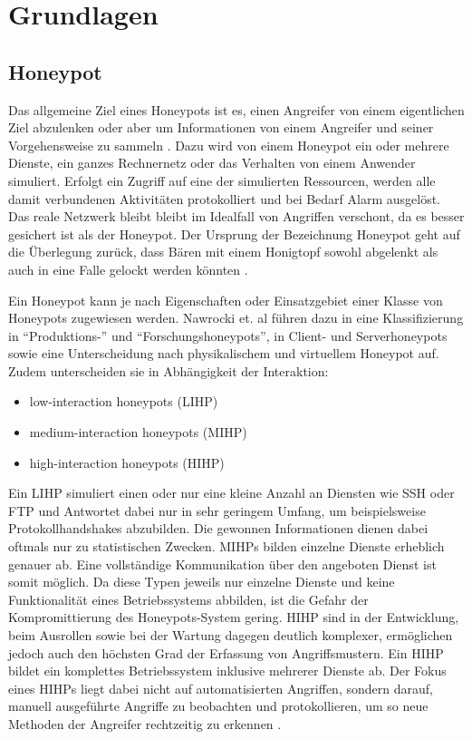 \chapter{Grundlagen}
\label{ch:Grundlagen}


\section{Honeypot}
\label{sec:Honeypot}

Das allgemeine Ziel eines Honeypots ist es, einen Angreifer von einem eigentlichen Ziel abzulenken oder aber um Informationen von einem Angreifer und seiner Vorgehensweise zu sammeln \cite{NawrockiWSKS16}. Dazu wird von einem Honeypot ein oder mehrere Dienste, ein ganzes Rechnernetz oder das Verhalten von einem Anwender simuliert. Erfolgt ein Zugriff auf eine der simulierten Ressourcen, werden alle damit verbundenen Aktivitäten protokolliert und bei Bedarf Alarm ausgelöst. Das reale Netzwerk bleibt bleibt im Idealfall von Angriffen verschont, da es besser gesichert ist als der Honeypot. Der Ursprung der Bezeichnung Honeypot geht auf die Überlegung zurück, dass Bären mit einem Honigtopf sowohl abgelenkt als auch in eine Falle gelockt werden könnten \cite{WikiHoney16}.


Ein Honeypot kann je nach Eigenschaften oder Einsatzgebiet einer Klasse von Honeypots zugewiesen werden. Nawrocki et. al führen dazu in \cite{NawrockiWSKS16} eine Klassifizierung in "`Produktions-"' und "`Forschungshoneypots"', in Client- und Serverhoneypots sowie eine Unterscheidung nach physikalischem und virtuellem Honeypot auf. Zudem unterscheiden sie in Abhängigkeit der Interaktion:

\begin{itemize}
\item low-interaction honeypots (LIHP)
\item medium-interaction honeypots (MIHP)
\item high-interaction honeypots (HIHP)
\end{itemize}

Ein LIHP simuliert einen oder nur eine kleine Anzahl an Diensten wie SSH oder FTP und Antwortet dabei nur in sehr geringem Umfang, um beispielsweise Protokollhandshakes abzubilden. Die gewonnen Informationen dienen dabei oftmals nur zu statistischen Zwecken.
MIHPs bilden einzelne Dienste erheblich genauer ab. Eine vollständige Kommunikation über den angeboten Dienst ist somit möglich. Da diese Typen jeweils nur einzelne Dienste und keine Funktionalität eines Betriebssystems abbilden, ist die Gefahr der Kompromittierung des Honeypots-System gering. HIHP sind in der Entwicklung, beim Ausrollen sowie bei der Wartung dagegen deutlich komplexer, ermöglichen jedoch auch den höchsten Grad der Erfassung von Angriffsmustern. Ein HIHP bildet ein komplettes Betriebssystem inklusive mehrerer Dienste ab. Der Fokus eines HIHPs liegt dabei nicht auf automatisierten Angriffen, sondern darauf, manuell ausgeführte Angriffe zu beobachten und protokollieren, um so neue Methoden der Angreifer rechtzeitig zu erkennen \cite{WikiHoney16}.


